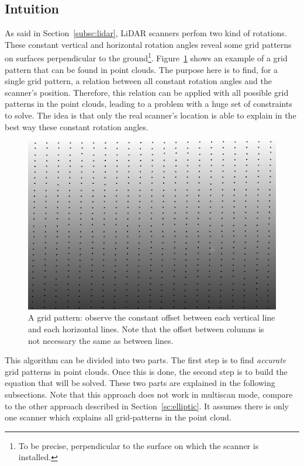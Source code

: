 \subsection{Intuition}
As said in Section~\ref{subsc:lidar}, LiDAR scanners perfom two kind of rotations. These constant vertical and horizontal rotation angles reveal some grid patterns on surfaces perpendicular to the ground\footnote{To be precise, perpendicular to the surface on which the scanner is installed.}. Figure~\ref{fig:grid1} shows an example of a grid pattern that can be found in point clouds. The purpose here is to find, for a single grid pattern, a relation between all constant rotation angles and the scanner's position. Therefore, this relation can be applied with all possible grid patterns in the point clouds, leading to a problem with a huge set of
constraints to solve. The idea is that only the real scanner's location is able to explain in the best way these constant rotation angles.

\begin{figure}
  \centering
  \includegraphics[scale=0.5]{img/grid1.png}
  \caption{A grid pattern: observe the constant offset between each vertical line and each horizontal lines. Note that the offset between columns is not necessary the same as between lines.}
  \label{fig:grid1}
\end{figure}

This algorithm can be divided into two parts. The first step is to find \emph{accurate} grid patterns in point clouds. Once this is done, the second step is to build the equation that will be solved. These two parts are explained in the following subsections. Note that this approach does not work in multiscan mode, compare to the other approach described in Section~\ref{sc:elliptic}. It assumes there is only one scanner which explains all grid-patterns in the point cloud.

